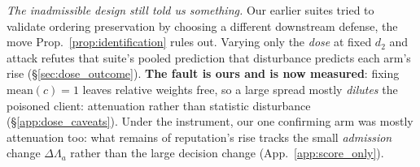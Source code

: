 \documentclass{article}
\begin{document}
\label{sec:dose_response}
\emph{The inadmissible design still told us something.} Our earlier suites tried to validate ordering preservation by choosing a different downstream defense, the move Prop.~\ref{prop:identification} rules out. Varying only the \emph{dose} at fixed $d_2$ and attack refutes that suite's pooled prediction that disturbance predicts each arm's rise (§\ref{sec:dose_outcome}). \textbf{The fault is ours and is now measured}: fixing $\mathrm{mean}(c){=}1$ leaves relative weights free, so a large spread mostly \emph{dilutes} the poisoned client: attenuation rather than statistic disturbance (§\ref{app:dose_caveats}). Under the instrument, our one confirming arm was mostly attenuation too: what remains of reputation's rise tracks the small \emph{admission} change $\Delta\Lambda_a$ rather than the large decision change (App.~\ref{app:score_only}).
\end{document}
